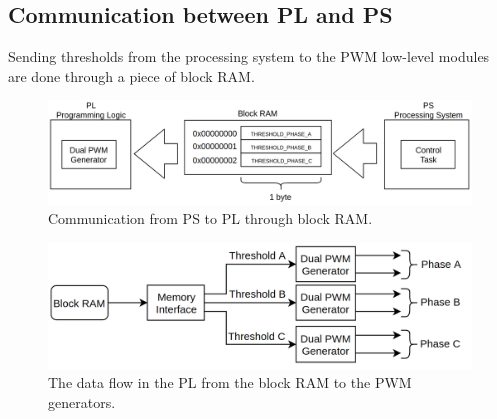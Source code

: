 \subsection{Communication between PL and PS}
Sending thresholds from the processing system to the PWM low-level modules are done through a piece of block RAM.

\begin{figure}[H]
	\centering
	\includegraphics[width=1\linewidth]{pictures/software/com_pl_to_ps.png}
	\caption{Communication from PS to PL through block RAM.}
	\label{fig:com_pl_to_ps}
\end{figure}

\begin{figure}[H]
	\centering
	\includegraphics[width=0.8\linewidth]{pictures/software/com_pl.png}
	\caption{The data flow in the PL from the block RAM to the PWM generators.}
	\label{fig:com_pl}
\end{figure}
